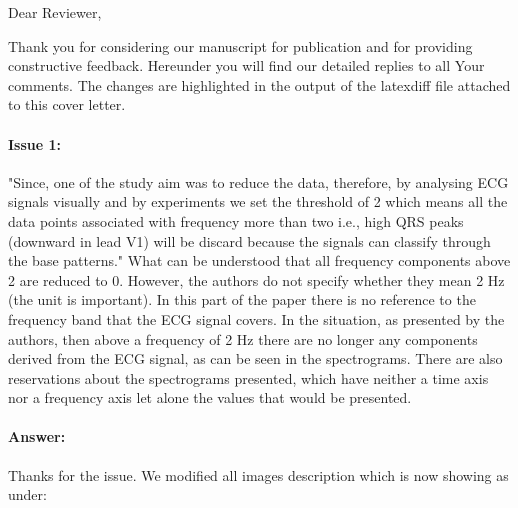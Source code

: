 \documentclass{article}
\begin{document}
Dear Reviewer,

\vspace{0.25in}

Thank you for considering our manuscript for publication and for providing constructive feedback.
Hereunder you will find our detailed replies to all Your comments.
The changes are highlighted in the output of the latexdiff file attached to this cover letter.


\paragraph{Issue 1:}
\begin{displayquote}
"Since, one of the study aim was to reduce the data, therefore, by analysing ECG signals visually and by experiments we set the threshold of 2 which means all the data points associated with frequency more than two i.e., high QRS peaks (downward in lead V1) will be discard because the signals can classify through the base patterns." What can be understood that all frequency components above 2 are reduced to 0. However, the authors do not specify whether they mean 2 Hz (the unit is important). In this part of the paper there is no reference to the frequency band that the ECG signal covers. In the situation, as presented by the authors, then above a frequency of 2 Hz there are no longer any components derived from the ECG signal, as can be seen in the spectrograms. There are also reservations about the spectrograms presented, which have neither a time axis nor a frequency axis let alone the values that would be presented.
\end{displayquote}

\paragraph{Answer:}

Thanks for the issue. We modified all images description which is now showing as under: \\\\
\end{document}
